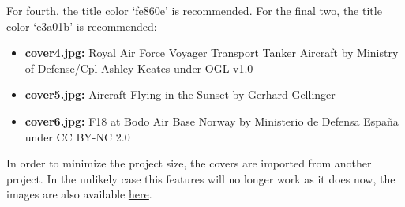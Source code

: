 \noindent For fourth, the title color `fe860e' is recommended. For the final two, the title color `e3a01b' is recommended:

\begin{itemize}
    \item \textbf{cover4.jpg:} Royal Air Force Voyager Transport Tanker Aircraft by Ministry of Defense/Cpl Ashley Keates under OGL v1.0
    \item \textbf{cover5.jpg:} Aircraft Flying in the Sunset by Gerhard Gellinger
    \item \textbf{cover6.jpg:} F18 at Bodo Air Base Norway by Ministerio de Defensa España under CC BY-NC 2.0
\end{itemize}

\noindent In order to minimize the project size, the covers are imported from another project. In the unlikely case this features will no longer work as it does now, the images are also available \underline{\href{https://github.com/dzwaneveld/TU-Delft-Unofficial-Report-Template/tree/master/layout/covers}{here}}.